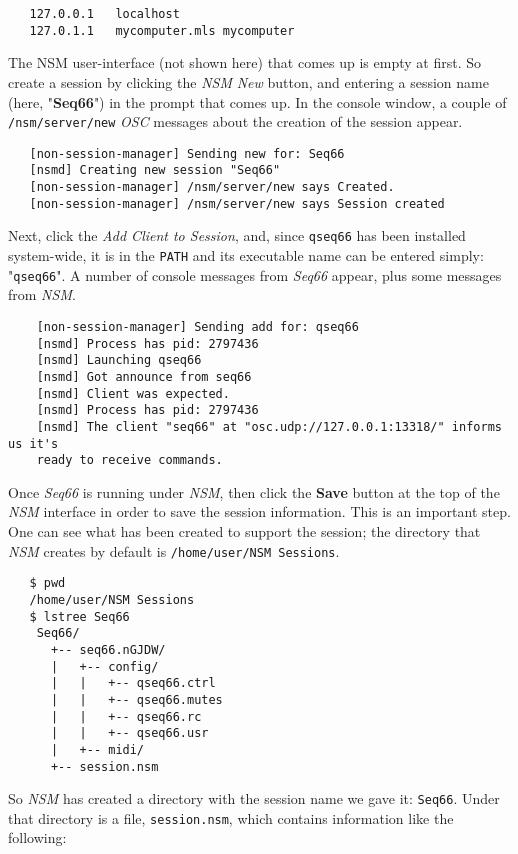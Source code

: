 \begin{verbatim}
   127.0.0.1   localhost
   127.0.1.1   mycomputer.mls mycomputer
\end{verbatim}

   The NSM user-interface (not shown here) that comes up is empty at first.
   So create a session by clicking the \textsl{NSM}
   \textsl{New} button, and entering a session name
   (here, "\textbf{Seq66}") in the
   prompt that comes up.  In the console window, a couple of 
   \texttt{/nsm/server/new} \textsl{OSC} messages
   about the creation of the session appear.

\begin{verbatim}
   [non-session-manager] Sending new for: Seq66
   [nsmd] Creating new session "Seq66"
   [non-session-manager] /nsm/server/new says Created.
   [non-session-manager] /nsm/server/new says Session created
\end{verbatim}

   Next, click the \textsl{Add Client to Session}, and, since
   \texttt{qseq66} has been installed system-wide, it is in the \texttt{PATH}
   and its executable name can be entered simply: "\texttt{qseq66}".
   A number of console messages from
   \textsl{Seq66} appear, plus some messages from \textsl{NSM}.

\begin{verbatim}
	[non-session-manager] Sending add for: qseq66
	[nsmd] Process has pid: 2797436
	[nsmd] Launching qseq66
	[nsmd] Got announce from seq66
	[nsmd] Client was expected.
	[nsmd] Process has pid: 2797436
	[nsmd] The client "seq66" at "osc.udp://127.0.0.1:13318/" informs us it's
    ready to receive commands.
\end{verbatim}

	Once \textsl{Seq66} is running under \textsl{NSM},
   then click the \textbf{Save}
   button at the top of the \textsl{NSM} interface in order
   to save the session information.  This is an important step.
   One can see what has been created to support the session;
   the directory that \textsl{NSM}
   creates by default is \texttt{/home/user/NSM Sessions}.

\begin{verbatim}
   $ pwd
   /home/user/NSM Sessions
   $ lstree Seq66
	Seq66/
	  +-- seq66.nGJDW/
	  |   +-- config/
	  |   |   +-- qseq66.ctrl
	  |   |   +-- qseq66.mutes
	  |   |   +-- qseq66.rc
	  |   |   +-- qseq66.usr
	  |   +-- midi/
	  +-- session.nsm
\end{verbatim}

	So \textsl{NSM} has created a directory with the session name we gave it:
   \texttt{Seq66}.  Under that directory is a file, \texttt{session.nsm}, which
   contains information like the following:

